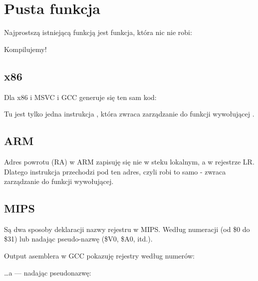 \section{Pusta funkcja}
\label{empty_func}

Najprostszą istniejącą funkcją jest funkcja, która nic nie robi:



Kompilujemy!

\subsection{x86}

Dla x86 i MSVC i GCC generuje się ten sam kod:



Tu jest tylko jedna instrukcja \RET, która zwraca zarządzanie do funkcji wywołującej .

\subsection{ARM}



Adres powrotu (\ac{RA}) w ARM zapisuję się nie w steku lokalnym, a w rejestrze \ac{LR}.
Dlatego instrukcja  przechodzi pod ten adres, czyli robi to samo - zwraca zarządzanie do funkcji wywołującej.

\subsection{MIPS}

Są dwa sposoby deklaracji nazwy rejestru w MIPS. Według numeracji (od \$0 do \$31) lub nadając pseudo-nazwę (\$V0, \$A0, itd.).

Output asemblera w GCC pokazuję rejestry według numerów:



\dots a \IDA --- nadając pseudonazwę:



